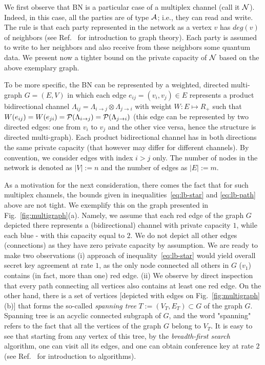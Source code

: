 \documentclass[aps,pra,twocolumn,superscriptaddress,longbibliography]{revtex4-1}
\begin{document}
We first observe that BN is a particular case of a multiplex channel (call it $\cal N$). Indeed, in this case, all the parties are of type $\cal A$; i.e., they can read and write. The rule is that each party represented in the network as a vertex $v$ has $deg(v)$ of neighbors (see Ref.~\cite{Wil96book} for introduction to graph theory). Each party is assumed to write to her neighbors and also receive from these neighbors some quantum data.
We present now a tighter bound on the private capacity of $\cal N$ based on the above exemplary graph.

To be more specific, the BN can be represented by a weighted, directed multi-graph $G=(E,V)$ in which each edge $e_{ij}=(v_i,v_j) \in E$ represents a product bidirectional channel $\Lambda_{ij}=\Lambda_{i\rightarrow j} \otimes \Lambda_{j\rightarrow i}$ with weight $W:E\mapsto R_+$ such that $W(e_{ij})= W(e_{ji})={\cal P}(\Lambda_{i\rightarrow j})={\cal P}(\Lambda_{j\rightarrow i})$ (this edge can be represented by two directed edges: one from $v_i$ to $v_j$ and the other vice versa, hence the structure is directed multi-graph). Each product bidirectional channel has in both directions the same private capacity (that however may differ for different channels). By convention, we consider edges with index $i>j$ only. The number of nodes in the network is denoted as $|V|:=n$ and the number of edges as $|E|:=m$.

As a motivation for the next consideration, there comes the fact that for such multiplex channels, the bounds given in inequalities~\eqref{eq:lb-star} and \eqref{eq:lb-path} above are not tight. We exemplify this on the graph presented in Fig.~\ref{fig:multigraph}(a). Namely, we assume that each red edge of the graph $G$ depicted there represents a (bidirectional) channel with private capacity $1$, while each blue - with this capacity equal to $2$. We do not depict all other edges (connections) as they have zero private capacity by assumption. We are ready to make two observations (i) approach of inequality~\eqref{eq:lb-star} would
    yield overall secret key agreement at rate $1$, as the only node connected all others in $G$ ($v_1$) contains
    (in fact, more than one) red edge. (ii) We observe by direct inspection that every path connecting all vertices also contains at least one red edge. On the other hand, there is a set of vertices [depicted with edges on Fig.~\ref{fig:multigraph}(b)] that forms the so-called {\it spanning tree} $T:=(V_T,E_T)\subset G$ of the graph $G$. Spanning tree is an acyclic connected subgraph of $G$, and the word "spanning" refers to the fact that all the vertices of the graph $G$ belong to $V_T$.
    It is easy to see that starting from any vertex of this tree, by the {\it breadth-first search } algorithm, one can visit all its edges, and one can obtain conference key at rate $2$ (see Ref.~\cite{LRCSbook} for introduction to algorithms). 
\end{document}
